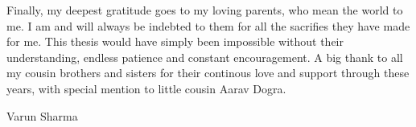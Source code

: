 Finally, my deepest gratitude goes to my loving parents, who mean the world to me. I am and will always be indebted to them for all the sacrifies they have made for me. 
This thesis would have simply been impossible without their understanding, endless patience and constant encouragement. A big thank to all my cousin brothers 
and sisters for their continous love and support through these years, with special mention to little cousin Aarav Dogra. 

\begin{flushright}
{\large Varun Sharma}
\end{flushright}

\onehalfspacing
